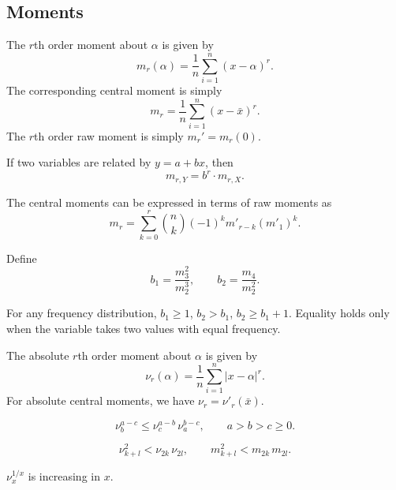 \documentclass[11pt]{article}
\theoremstyle{definition}
\theoremstyle{remark}
\numberwithin{equation}{section}
\begin{document}
    \subsection{Moments}
    
    The $r$th order moment about $\alpha$ is given by \[
        m_r(\alpha) = \frac{1}{n}\sum_{i = 1}^n (x - \alpha)^r.
    \] The corresponding central moment is simply \[
        m_r = \frac{1}{n}\sum_{i = 1}^n (x - \bar{x})^r.
    \] The $r$th order raw moment is simply $m_r' = m_r(0)$.

    \begin{lemma}
        If two variables are related by $y = a + bx$, then \[
            m_{r, Y} = b^r\cdot m_{r, X}.
        \] 
    \end{lemma}

    \begin{lemma}
        The central moments can be expressed in terms of raw moments as \[
            m_r = \sum_{k = 0}^r \binom{n}{k} (-1)^k m'_{r - k}(m'_1)^k.
        \]
    \end{lemma}

    \begin{definition}
        Define \[
            b_1 = \frac{m_3^2}{m_2^3}, \qquad b_2 = \frac{m_4}{m_2^2}.
        \] 
    \end{definition}

    \begin{theorem}
        For any frequency distribution, $b_1 \geq 1$, $b_2 > b_1$, $b_2 \geq b_1 +
        1$. Equality holds only when the variable takes two values with equal
        frequency.
    \end{theorem}
    
    The absolute $r$th order moment about $\alpha$ is given by \[
        \nu_r(\alpha) = \frac{1}{n}\sum_{i = 1}^n |x - \alpha|^r.
    \] For absolute central moments, we have $\nu_r = \nu'_r(\bar{x})$.


    \begin{theorem}
        \[
            \nu_{b}^{a - c} \leq \nu_{c}^{a - b}\,\nu_{a}^{b - c}, \qquad
            a > b > c \geq 0.
        \] 
    \end{theorem}
    \begin{corollary}
        \[
            \nu_{k + l}^2 < \nu_{2k}\,\nu_{2l}, \qquad
            m_{k + l}^2 < m_{2k}\,m_{2l}.
        \] 
    \end{corollary}
    
    \begin{theorem}[Liapunov]
        $\nu_{x}^{1 / x}$ is increasing in $x$.
    \end{theorem}
\end{document}
